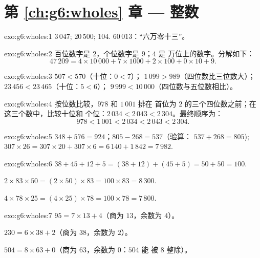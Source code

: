 \section*{第 \ref{ch:g6:wholes} 章 --- 整数}

\begin{solution}{exo:g6:wholes:1}
$3\,047$; \quad $20\,500$; \quad $104$. \quad
$60\,013$：“六万零十三”。
\end{solution}

\begin{solution}{exo:g6:wholes:2}
百位数字是 $2$，个位数字是 $9$；$4$ 是
万位上的数字。分解如下：
\[
47\,209 = 4 \times 10\,000 + 7 \times 1000 + 2 \times 100 + 0 \times 10
+ 9 .
\]
\end{solution}

\begin{solution}{exo:g6:wholes:3}
$507 < 570$（十位：$0 < 7$）；\quad
$1\,099 > 989$（四位数比三位数大）；\quad
$23\,456 < 23\,465$（十位：$5 < 6$）；\quad
$9\,999 < 10\,000$（四位数与五位数相比）。
\end{solution}

\begin{solution}{exo:g6:wholes:4}
按位数比较，$978$ 和 $1\,001$ 排在
首位为 $2$ 的三个四位数之前；在这三个数中，比较十位和
个位：$2\,034 < 2\,043 < 2\,304$。最终顺序为：
\[
978 < 1\,001 < 2\,034 < 2\,043 < 2\,304 .
\]
\end{solution}

\begin{solution}{exo:g6:wholes:5}
$348 + 576 = 924$；\quad $805 - 268 = 537$（验算：
$537 + 268 = 805$); \quad $307 \times 26 = 307 \times 20 + 307 \times 6
= 6\,140 + 1\,842 = 7\,982$.
\end{solution}

\begin{solution}{exo:g6:wholes:6}
$38 + 45 + 12 + 5 = (38 + 12) + (45 + 5) = 50 + 50 = 100$.

$2 \times 83 \times 50 = (2 \times 50) \times 83 = 100 \times 83 =
8\,300$.

$4 \times 78 \times 25 = (4 \times 25) \times 78 = 100 \times 78 =
7\,800$.
\end{solution}

\begin{solution}{exo:g6:wholes:7}
$95 = 7 \times 13 + 4$（商为 $13$，余数为 $4$）。

$230 = 6 \times 38 + 2$（商为 $38$，余数为 $2$）。

$504 = 8 \times 63 + 0$（商为 $63$，余数为 $0$：$504$ 能
被 $8$ 整除）。
\end{solution}

